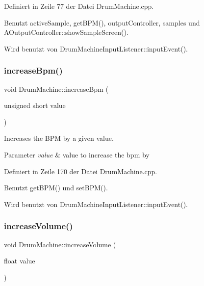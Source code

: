 Definiert in Zeile 77 der Datei Drum\+Machine.\+cpp.



Benutzt active\+Sample, get\+B\+P\+M(), output\+Controller, samples und A\+Output\+Controller\+::show\+Sample\+Screen().



Wird benutzt von Drum\+Machine\+Input\+Listener\+::input\+Event().

\mbox{\label{class_drum_machine_adbaa7d80f7aa34f1ca190e163515e3e6}} 
\subsubsection{\texorpdfstring{increase\+Bpm()}{increaseBpm()}}
{\footnotesize\ttfamily void Drum\+Machine\+::increase\+Bpm (\begin{DoxyParamCaption}\item[{unsigned short}]{value }\end{DoxyParamCaption})}

Increases the B\+PM by a given value. 
\begin{DoxyParams}{Parameter}
{\em value} & value to increase the bpm by \\
\hline
\end{DoxyParams}


Definiert in Zeile 170 der Datei Drum\+Machine.\+cpp.



Benutzt get\+B\+P\+M() und set\+B\+P\+M().



Wird benutzt von Drum\+Machine\+Input\+Listener\+::input\+Event().

\mbox{\label{class_drum_machine_ab823055aa6c1fa1dd91b1e45f3e66f0f}} 
\subsubsection{\texorpdfstring{increase\+Volume()}{increaseVolume()}}
{\footnotesize\ttfamily void Drum\+Machine\+::increase\+Volume (\begin{DoxyParamCaption}\item[{float}]{value }\end{DoxyParamCaption})}

